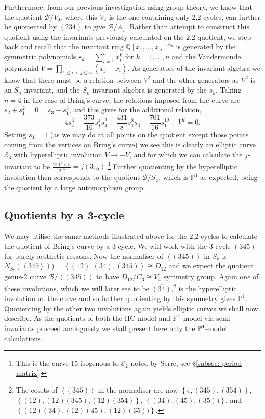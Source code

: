 \documentclass{amsart}
\newcommand{\pbrace}[1]{\left\{ #1 \right\} }
\newcommand{\pangle}[1]{\left\langle #1 \right\rangle}
\begin{document}
Furthermore, from our previous investigation using group theory, we know that the quotient $\mathcal{B}/V_4$, where this $V_4$ is the one containing only 2,2-cycles, can further be quotiented by $(234)$ to give $\mathcal{B}/A_4$. Rather than attempt to construct this quotient using the invariants previously calculated on the 2,2-quotient, we step back and recall that the invariant ring $\mathbb{Q}[x_1, \dots, x_n]^{A_n}$ is generated by the symmetric polynomials $s_k = \sum_{i=1}^n x_i^k$ for $k=1, \dots, n$ and the Vandermonde polynomial $V = \prod_{1 \leq i < j \leq n} (x_j - x_i)$. As generators of the invariant algebra we know that there must be a relation between $V^2$ and the other generators as $V^2$ is an $S_n$-invariant, and the $S_n$-invariant algebra is generated by the $s_k$. Taking $n=4$ in the case of Bring's curve, the relations imposed from the curve are $s_2 + s_1^2 = 0 = s_3 - s_1^3$, and this gives for the additional relation, 
\begin{equation}\label{ref: quotient by 3cycle}
4 s_4^3 - \frac{373}{16} s_1^4 s_4^2 + \frac{431}{8} s_1^8 s_4 - \frac{701}{16} s_1^{12} + V^2 = 0 . 
\end{equation}
Setting $s_1=1$ (as we may do at all points on the quotient except those points coming from the vertices on Bring's curve) we see this is clearly an elliptic curve $\mathcal{E}_3$ with hyperelliptic involution $V \to -V$, and for which we can calculate the $j$-invariant to be $\frac{211^3 \times 5}{2^{15}} = j(3 \tau_0)$.\footnote{This is the curve 15-isogenous to $\mathcal{E}_2$ noted by Serre, see \S\ref{subsec: period matrix}.} Further quotienting by the hyperelliptic involution then corresponds to the quotient $\mathcal{B}/S_4$, which is $\mathbb{P}^1$ as expected, being the quotient by a large automorphism group.  

\subsection{Quotients by a 3-cycle}\label{subsec: quotient by 3-cycle}
We may utilise the same methods illustrated above for the 2,2-cycles to calculate the quotient of Bring's curve by a 3-cycle. We will work with the 3-cycle $(345)$ for purely aesthetic resaons. 
Now the normaliser of $\pangle{(345)}$ in $S_5$ is $N_{S_5}(\pangle{345}))=\pangle{(12), (34), (345)}\cong D_{12}$ and
we expect the quotient genus-2 curve $\mathcal{B}/\pangle{(345)}$ to have $D_{12}/C_3 \cong V_4$ symmetry group.
Again one of these involutions, which we will later see to be $\overline{(34)}$,\footnote{The cosets of $\pangle{(345)}$ in the normaliser are now $\pbrace{e, (345), (3 5 4)}$,
 $\pbrace{(12), (12)(345), (12)(3 5 4)}$,
 $\pbrace{(34), (45), (35))}$, and 
$\pbrace{(12)(34), (12)(45), (12)(35))}$.} is the hyperelliptic involution on the curve and so further quotienting by this symmetry gives $\mathbb{P}^1$. Quotienting by the other two involutions again yields elliptic curves we shall now describe. As the quotients of both the HC-model and $\mathbb{P}\sp4$-model via semi-invariants proceed analogously we shall present here only the $\mathbb{P}\sp4$-model calculations.
\end{document}
